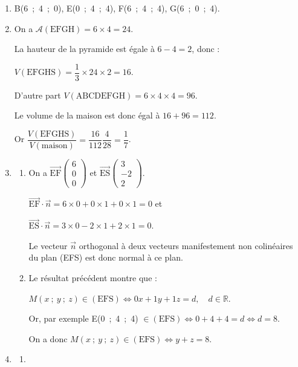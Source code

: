 \documentclass[10pt]{article}
\providecommand{\R}{\mathbb{R}}
\providecommand{\vect}[1]{\overrightarrow{#1}}
\begin{document}
\begin{enumerate}
\item 
B(6~;~4~;~0), \quad E(0~;~4~;~4), \quad F(6~;~4~;~4), \quad G(6~;~0~;~4).
\item 




On a $\mathcal{A}(\text{EFGH}) = 6 \times 4 = 24$.

La hauteur de la pyramide est égale à $6 - 4 = 2$, donc :

$V(\text{EFGHS}) = \dfrac13 \times 24 \times 2 = 16$.

D'autre part $V(\text{ABCDEFGH})  = 6 \times 4 \times 4 = 96$.

Le volume de la maison est donc égal à $16 + 96 = 112$.

Or $\dfrac{V(\text{EFGHS})}{V(\text{maison})} = \dfrac{16}{112}\dfrac{4}{28} = \dfrac{1}{7}$.
\item 
	\begin{enumerate}
		\item 
		On a $\vect{\text{EF}}\begin{pmatrix}6\\0\\0\end{pmatrix}$ et $\vect{\text{ES}}\begin{pmatrix}3\\-2\\2\end{pmatrix}$.
		
$\vect{\text{EF}}\cdot \vect{n} = 6 \times 0 + 0 \times 1 + 0 \times 1 = 0$ et 

$\vect{\text{ES}}\cdot \vect{n} = 3 \times 0 - 2 \times 1 + 2 \times 1 = 0$.

Le vecteur $\vect{n}$ orthogonal à deux vecteurs manifestement non colinéaires du plan (EFS) est donc normal à ce plan.
		\item 
		Le résultat précédent montre que :
		
$M(x~;~y~;~z) \in (\text{EFS}) \iff 0x + 1y + 1z = d, \quad d \in \R$.

Or, par exemple E(0~;~4~;~4) $\in (\text{EFS}) \iff 0 + 4 + 4 = d \iff d = 8$.

On a donc $M(x~;~y~;~z) \in (\text{EFS}) \iff y + z = 8.$
	\end{enumerate}	
\item 






	\begin{enumerate}
		\item 







\end{enumerate}
\end{enumerate}
\end{document}

